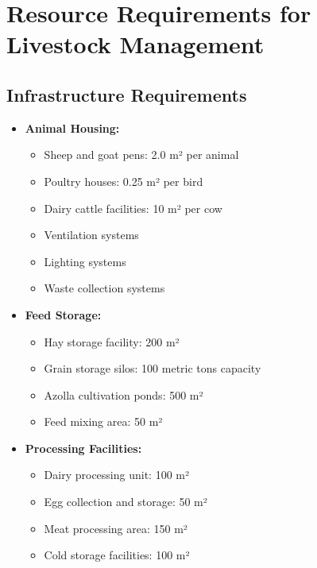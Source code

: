 \section{Resource Requirements for Livestock Management}

\subsection{Infrastructure Requirements}
\begin{itemize}
    \item \textbf{Animal Housing:}
    \begin{itemize}
        \item Sheep and goat pens: 2.0 m² per animal
        \item Poultry houses: 0.25 m² per bird
        \item Dairy cattle facilities: 10 m² per cow
        \item Ventilation systems
        \item Lighting systems
        \item Waste collection systems
    \end{itemize}
    
    \item \textbf{Feed Storage:}
    \begin{itemize}
        \item Hay storage facility: 200 m²
        \item Grain storage silos: 100 metric tons capacity
        \item Azolla cultivation ponds: 500 m²
        \item Feed mixing area: 50 m²
    \end{itemize}
    
    \item \textbf{Processing Facilities:}
    \begin{itemize}
        \item Dairy processing unit: 100 m²
        \item Egg collection and storage: 50 m²
        \item Meat processing area: 150 m²
        \item Cold storage facilities: 100 m²
    \end{itemize}
\end{itemize}

